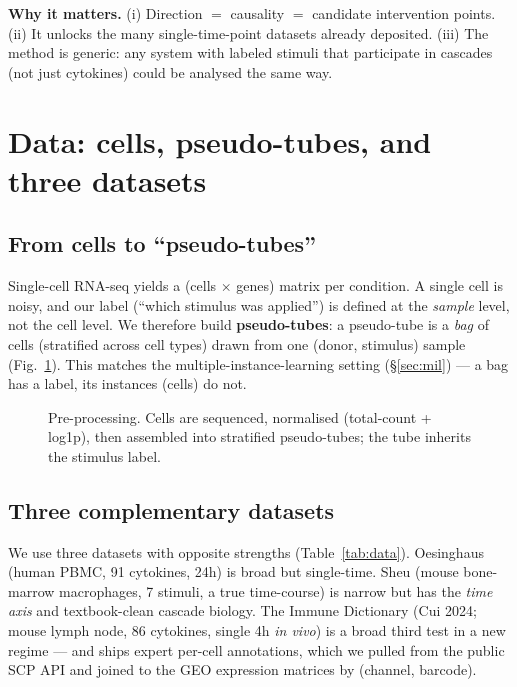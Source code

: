 \documentclass[11pt]{article}
\begin{document}
\textbf{Why it matters.} (i) Direction $=$ causality $=$ candidate intervention
points. (ii) It unlocks the many single-time-point datasets already deposited.
(iii) The method is generic: any system with labeled stimuli that participate in
cascades (not just cytokines) could be analysed the same way.

\section{Data: cells, pseudo-tubes, and three datasets}\label{sec:data}

\subsection{From cells to ``pseudo-tubes''}
Single-cell RNA-seq yields a (cells $\times$ genes) matrix per condition. A single
cell is noisy, and our label (``which stimulus was applied'') is defined at the
\emph{sample} level, not the cell level. We therefore build \textbf{pseudo-tubes}:
a pseudo-tube is a \emph{bag} of cells (stratified across cell types) drawn from
one (donor, stimulus) sample (Fig.~\ref{fig:f4}). This matches the
multiple-instance-learning setting (§\ref{sec:mil}) --- a bag has a label, its
instances (cells) do not.

\begin{figure}[h]\centering
{}
\caption{Pre-processing. Cells are sequenced, normalised (total-count + log1p),
then assembled into stratified pseudo-tubes; the tube inherits the stimulus
label.}\label{fig:f4}
\end{figure}

\subsection{Three complementary datasets}
We use three datasets with opposite strengths (Table~\ref{tab:data}). Oesinghaus
(human PBMC, 91 cytokines, 24h) is broad but single-time. Sheu (mouse bone-marrow
macrophages, 7 stimuli, a true time-course) is narrow but has the \emph{time axis}
and textbook-clean cascade biology. The Immune Dictionary (Cui 2024; mouse lymph
node, 86 cytokines, single 4h \emph{in vivo}) is a broad third test in a new
regime --- and ships expert per-cell annotations, which we pulled from the public
SCP API and joined to the GEO expression matrices by (channel, barcode).
\end{document}
